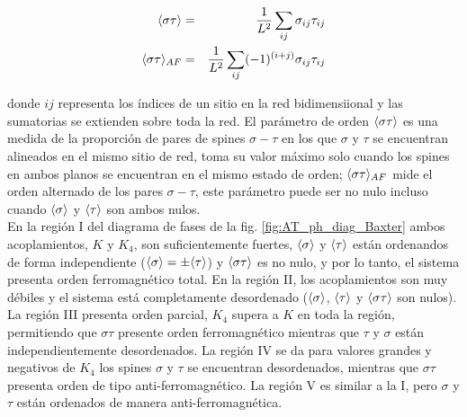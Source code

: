 \begin{center} 
\begin{eqnarray}
	\label{eq:op_Mst}
	\langle \sigma\tau \rangle&=&\frac{1}{L^{2}}\sum_{ij}\sigma_{ij}\tau_{ij} \\
	\label{eq:op_stagMst}
	\langle \sigma\tau \rangle_{AF}&=&\frac{1}{L^{2}}\sum_{ij}(-1)^{(i+j)}\sigma_{ij}\tau_{ij}
\end{eqnarray}
\end{center}
 donde $ij$ representa los \'indices de un sitio en la red bidimensiional y las sumatorias se extienden sobre toda la red.
El parámetro de orden $\langle \sigma \tau \rangle$ es una medida de la proporci\'on de pares de spines $\sigma-\tau$ en los que $\sigma$ y $\tau$
 se encuentran alineados en el mismo sitio de red, toma su valor máximo solo cuando los spines en ambos planos se encuentran en el mismo estado de orden;
 $\langle \sigma\tau \rangle_{AF}$ mide el orden alternado de los pares $\sigma-\tau$,
 este par\'ametro puede ser no nulo incluso cuando $\langle \sigma \rangle$ y $\langle \tau \rangle$ son ambos nulos.\\

En la regi\'on I del diagrama de fases de la fig. \ref{fig:AT_ph_diag_Baxter} ambos acoplamientos, $K$ y $K_{4}$, son suficientemente fuertes, $\langle \sigma \rangle$ y $\langle \tau \rangle$ est\'an ordenandos de forma independiente
 ($\langle \sigma \rangle=\pm \langle \tau \rangle$) y $\langle \sigma\tau \rangle$ es no nulo, y por lo tanto,%
 el sistema presenta orden ferromagn\'etico total. En la regi\'on II, los acoplamientos son muy d\'ebiles y el sistema est\'a
 completamente desordenado ($\langle \sigma \rangle$, $\langle \tau \rangle$ y $\langle \sigma\tau \rangle$ son nulos).
La regi\'on III presenta orden parcial, $K_{4}$ supera a $K$ en toda la regi\'on, permitiendo que $\sigma\tau$ presente orden ferromagn\'etico mientras que $\tau$ y $\sigma$
 est\'an independientemente desordenados.
La regi\'on IV se da para valores grandes y negativos de $K_{4}$ los spines $\sigma$ y $\tau$ se encuentran desordenados, mientras que $\sigma\tau$ presenta orden de tipo anti-ferromagn\'etico.
La región V es similar a la I, pero $\sigma$ y $\tau$ están ordenados de manera anti-ferromagnética.\\

